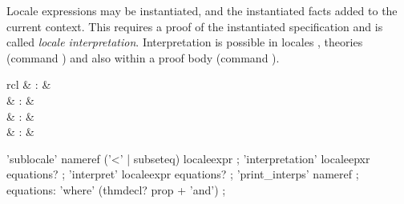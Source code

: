 \begin{isabellebody}
\begin{isamarkuptext}
\begin{description}
  \end{description}%
\end{isamarkuptext}%
\isamarkuptrue%
%
\isamarkuptrue%
%
\begin{isamarkuptext}%
Locale expressions may be instantiated, and the instantiated facts
  added to the current context.  This requires a proof of the
  instantiated specification and is called \emph{locale
  interpretation}.  Interpretation is possible in locales \hyperlink{command.sublocale}{\mbox{}}, theories (command \hyperlink{command.interpretation}{\mbox{}}) and
  also within a proof body (command \hyperlink{command.interpret}{\mbox{}}).

  \begin{matharray}{rcl}
    \hypertarget{command.sublocale}{\hyperlink{command.sublocale}{\mbox{}}} & : &  \\
    \hypertarget{command.interpretation}{\hyperlink{command.interpretation}{\mbox{}}} & : &  \\
    \hypertarget{command.interpret}{\hyperlink{command.interpret}{\mbox{}}} & : &  \\
    \hypertarget{command.print-interps}{\hyperlink{command.print-interps}{\mbox{}}}\isa{{\isachardoublequote}\isactrlsup {\isacharasterisk}{\isachardoublequote}} & : &  \\
  \end{matharray}

  \begin{rail}
    'sublocale' nameref ('<' | subseteq) localeexpr
    ;
    'interpretation' localeepxr equations?
    ;
    'interpret' localeexpr equations?
    ;
    'print\_interps' nameref
    ;
    equations: 'where' (thmdecl? prop + 'and')
    ;
  \end{rail}


\end{isamarkuptext}
\end{isabellebody}
